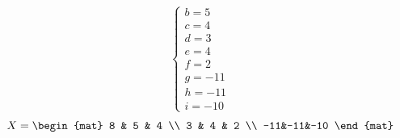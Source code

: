 \begin{task}{7.10}
\begin{align*}
\begin{cases}
			b= 5\\
			c= 4\\
			d= 3\\
			e= 4\\
			f= 2\\
			g= -11\\
			h= -11\\
			i= -10
		\end{cases}
	\end{align*}
	\[X=
	\begin{mat}
	8 & 5 & 4 \\
	3 & 4 & 2 \\
	-11&-11&-10
	\end{mat}\]
\end{task}